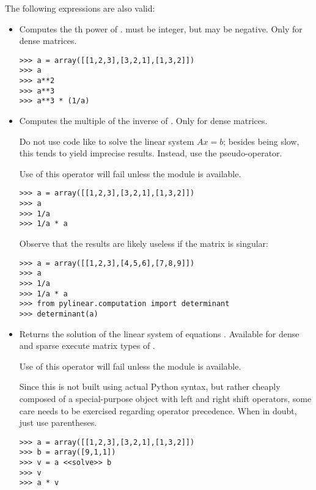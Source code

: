 The following expressions are also valid:
\begin{itemize} 
\item {}

  Computes the th power of .  must be
  integer, but may be negative. Only for dense matrices.

\begin{verbatim}
>>> a = array([[1,2,3],[3,2,1],[1,3,2]])
>>> a
>>> a**2
>>> a**3
>>> a**3 * (1/a)
\end{verbatim}
\item {}

  Computes the  multiple of the inverse of
  . Only for dense matrices.

  Do not use code like  to solve the linear system
  $Ax=b$; besides being slow, this tends to yield imprecise
  results. Instead, use the  pseudo-operator.

  Use of this operator will fail unless the module
   is available.

\begin{verbatim}
>>> a = array([[1,2,3],[3,2,1],[1,3,2]])
>>> a
>>> 1/a
>>> 1/a * a
\end{verbatim}

  Observe that the results are likely useless if the matrix
  is singular:

\begin{verbatim}
>>> a = array([[1,2,3],[4,5,6],[7,8,9]])
>>> a
>>> 1/a
>>> 1/a * a
>>> from pylinear.computation import determinant
>>> determinant(a)
\end{verbatim}

\item {}

  Returns the solution of the linear system of equations .
  Available for dense and sparse execute matrix types of .

  Use of this operator will fail unless the module
   is available.

  Since this is not built using actual Python syntax, but rather cheaply
  composed of a special-purpose  object with left and right
  shift operators, some care needs to be exercised regarding operator
  precedence. When in doubt, just use parentheses.

\begin{verbatim}
>>> a = array([[1,2,3],[3,2,1],[1,3,2]])
>>> b = array([9,1,1])
>>> v = a <<solve>> b
>>> v
>>> a * v
\end{verbatim}


\end{itemize}
